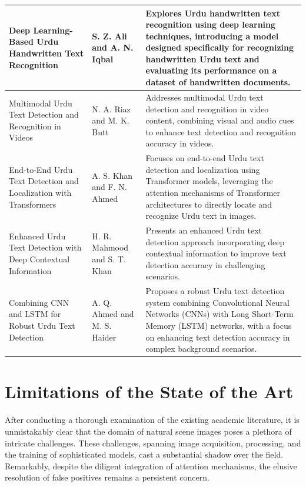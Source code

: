 \begin{center}
\begin{longtable}{|p{4cm}|p{4.5cm}|p{7.5cm}|}
Deep Learning-Based Urdu Handwritten Text Recognition & S. Z. Ali and A. N. Iqbal & Explores Urdu handwritten text recognition using deep learning techniques, introducing a model designed specifically for recognizing handwritten Urdu text and evaluating its performance on a dataset of handwritten documents. \\
\hline

Multimodal Urdu Text Detection and Recognition in Videos & N. A. Riaz and M. K. Butt & Addresses multimodal Urdu text detection and recognition in video content, combining visual and audio cues to enhance text detection and recognition accuracy in videos. \\
\hline

End-to-End Urdu Text Detection and Localization with Transformers & A. S. Khan and F. N. Ahmed & Focuses on end-to-end Urdu text detection and localization using Transformer models, leveraging the attention mechanisms of Transformer architectures to directly locate and recognize Urdu text in images. \\
\hline

Enhanced Urdu Text Detection with Deep Contextual Information & H. R. Mahmood and S. T. Khan & Presents an enhanced Urdu text detection approach incorporating deep contextual information to improve text detection accuracy in challenging scenarios. \\
\hline

Combining CNN and LSTM for Robust Urdu Text Detection & A. Q. Ahmed and M. S. Haider & Proposes a robust Urdu text detection system combining Convolutional Neural Networks (CNNs) with Long Short-Term Memory (LSTM) networks, with a focus on enhancing text detection accuracy in complex background scenarios. \\
\hline
\end{longtable}
\end{center}

\pagebreak

\section{Limitations of the State of the Art} \label{losota}
After conducting a thorough examination of the existing academic literature, it is unmistakably clear that the domain of natural scene images poses a plethora of intricate challenges. These challenges, spanning image acquisition, processing, and the training of sophisticated models, cast a substantial shadow over the field. Remarkably, despite the diligent integration of attention mechanisms, the elusive resolution of false positives remains a persistent concern.

